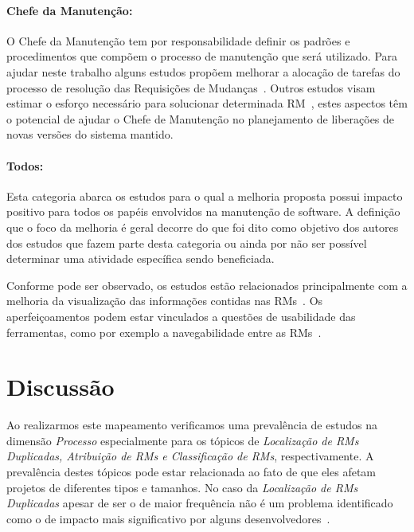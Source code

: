 \paragraph{Chefe da Manutenção:}

O Chefe da Manutenção tem por responsabilidade definir os padrões e
procedimentos que compõem o processo de manutenção que será utilizado. Para
ajudar neste trabalho alguns estudos propõem melhorar a alocação de tarefas do
processo de resolução das Requisições de Mudanças~\cite{netto2010automated}.
Outros estudos visam estimar o esforço necessário para solucionar determinada
RM~\cite{Vijayakumar2014, Nagwani2010}, estes aspectos têm o potencial de ajudar
o Chefe de Manutenção no planejamento de liberações de novas versões do sistema
mantido.

\paragraph{Todos:}

Esta categoria abarca os estudos para o qual a melhoria proposta possui impacto
positivo para todos os papéis envolvidos na manutenção de software. A definição
que o foco da melhoria é geral decorre do que foi dito como objetivo dos autores
dos estudos que fazem parte desta categoria ou ainda por não ser possível
determinar uma atividade específica sendo beneficiada.

Conforme pode ser observado, os estudos estão relacionados principalmente com a
melhoria da  visualização das informações contidas nas RMs~\cite{hora2012bug,
	takama2013application, dal2014bug}. Os aperfeiçoamentos podem estar
vinculados a questões de usabilidade das ferramentas, como por exemplo a
navegabilidade entre as RMs~\cite{dal2014bug}.

\section{Discussão}\label{sec:discussao}

Ao realizarmos este mapeamento verificamos uma prevalência de estudos na
dimensão \textit{Processo} especialmente para os tópicos de \textit{Localização
    de RMs Duplicadas, Atribuição de RMs e Classificação de RMs},
respectivamente. A prevalência destes tópicos pode estar relacionada ao fato de
que eles afetam projetos de diferentes tipos e tamanhos. No caso da
\textit{Localização de RMs Duplicadas} apesar de ser o de maior frequência não é
um problema identificado como o de impacto mais significativo por alguns
desenvolvedores~\cite{zimmermann2010makes}.

